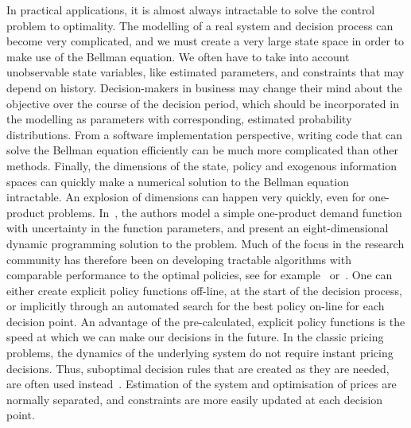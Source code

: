 \documentclass[main.tex]{subfiles}
\begin{document}
In practical applications, it is almost always
intractable to solve the control problem to optimality.
The modelling of a real system and decision process can become very
complicated, and  we must  create a very
large state space in order to make use of the Bellman equation.
We often have to take into account unobservable
state variables, like estimated parameters, and constraints
that may depend on history. Decision-makers in business may change their mind
about the objective over the course of the decision period, which should
be incorporated in the modelling as parameters with corresponding, estimated
probability distributions.
From a software implementation perspective, writing code that can
solve the Bellman equation efficiently can be much more complicated
than other methods.
Finally, the dimensions of the state, policy and exogenous
information spaces can quickly make a numerical solution to the Bellman
equation intractable. An explosion of dimensions can happen very
quickly, even for one-product problems.
In~\cite{bertsimas2001dynamic}, the authors model a simple
one-product demand function with uncertainty in the function
parameters, and present an eight-dimensional dynamic programming
solution to the problem.
Much of the focus in the research community has therefore been on
developing tractable algorithms with comparable performance to the
optimal policies, see for
example~\cite{powell2011approximate} or~\cite{bertsekas2012dynamic}.
One can either create explicit policy functions off-line, at the
start of the decision process, or implicitly through an automated
search for the best policy on-line for each decision point.
An advantage of the pre-calculated, explicit policy functions
is the speed at which we can make our decisions in the
future. In the classic pricing problems, the dynamics of the
underlying system do not require instant pricing decisions. Thus,
suboptimal decision rules that are created as they are needed, are often used
instead~\cite{talluri2006theory}. Estimation of the system and optimisation of prices are
normally separated, and constraints are more easily updated at each
decision point.
\end{document}
